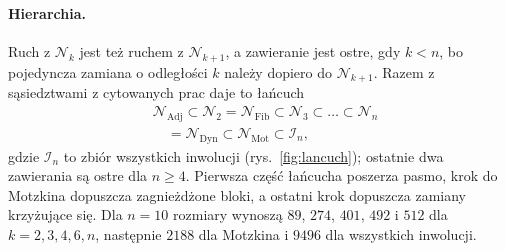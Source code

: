 \documentclass[letterpaper]{article} %
\theoremstyle{definition}
\newcommand{\N}{\mathcal{N}}
\begin{document}
\paragraph{Hierarchia.} Ruch z $\N_k$ jest też ruchem z $\N_{k+1}$,
a zawieranie jest ostre, gdy $k<n$, bo pojedyncza zamiana o odległości $k$ należy dopiero do $\N_{k+1}$. Razem z sąsiedztwami z cytowanych
prac daje to łańcuch
\begin{equation}\label{eq:lancuch}
\begin{split}
&\N_{\mathrm{Adj}}\subset\N_2=\N_{\mathrm{Fib}}\subset\N_3\subset\dots\subset\N_n\\
&\quad=\N_{\mathrm{Dyn}}\subset\N_{\mathrm{Mot}}\subset\mathcal I_n,
\end{split}
\end{equation}
gdzie $\mathcal I_n$ to zbiór wszystkich inwolucji
(rys.~\ref{fig:lancuch}); ostatnie dwa zawierania są ostre dla $n\geq 4$. Pierwsza część łańcucha poszerza pasmo, krok do
Motzkina dopuszcza zagnieżdżone bloki, a ostatni krok dopuszcza zamiany krzyżujące się. Dla $n=10$ rozmiary wynoszą $89$, $274$, $401$, $492$ i $512$ dla $k=2,3,4,6,n$, następnie $2188$ dla Motzkina i $9496$ dla wszystkich inwolucji.
\end{document}
